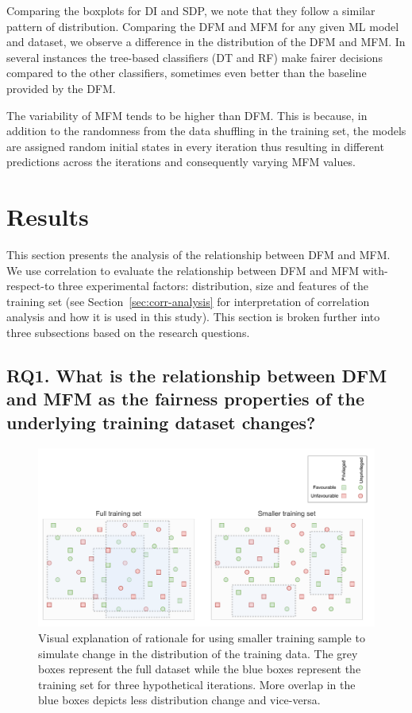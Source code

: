 \documentclass[sigconf,review,anonymous]{acmart}
\begin{document}
Comparing the boxplots for DI and SDP, we note that they follow a
similar pattern of distribution. Comparing the DFM and MFM for any
given ML model and dataset, we observe a difference in the
distribution of the DFM and MFM. In several instances the tree-based
classifiers (DT and RF) make fairer decisions compared to the other
classifiers, sometimes even better than the baseline provided by the
DFM.

The variability of MFM tends to be higher than DFM. This is because,
in addition to the randomness from the data shuffling in the training
set, the models are assigned random initial states in every iteration
thus resulting in different predictions across the iterations and
consequently varying MFM values.

\section{Results}\label{sec:results}

This section presents the analysis of the relationship between DFM and
MFM. We use correlation to evaluate the relationship between DFM and
MFM with-respect-to three experimental factors: distribution, size and
features of the training set (see Section \ref{sec:corr-analysis} for
interpretation of correlation analysis and how it is used in this
study). This section is broken further into three subsections based on
the research questions.

\subsection{RQ1. What is the relationship between DFM and MFM as
the fairness properties of the underlying training dataset
changes?}\label{sec:results-full-rel}

\begin{figure}
  \centering
  \includegraphics[width=\linewidth]{shuffle.pdf}
  \caption{Visual explanation of rationale for using smaller training
    sample to simulate change in the distribution of the training
    data. The grey boxes represent the full dataset while the blue
    boxes represent the training set for three hypothetical
    iterations. More overlap in the blue boxes depicts less
    distribution change and vice-versa.}
  \label{fig:shuffle}
\end{figure}
\end{document}
